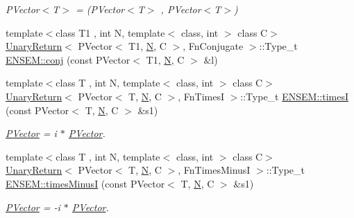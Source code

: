\begin{DoxyCompactItemize}
\begin{DoxyCompactList}\small\item\em P\+Vector$<$\+T$>$ = (P\+Vector$<$\+T$>$ , P\+Vector$<$\+T$>$) \end{DoxyCompactList}\item 
{\footnotesize template$<$class T1 , int N, template$<$ class, int $>$ class C$>$ }\\\mbox{\hyperlink{structUnaryReturn}{Unary\+Return}}$<$ P\+Vector$<$ T1, \mbox{\hyperlink{adat__devel_2lib_2hadron_2operator__name__util_8cc_a7722c8ecbb62d99aee7ce68b1752f337}{N}}, C $>$, Fn\+Conjugate $>$\+::Type\+\_\+t \mbox{\hyperlink{group__primvector_gaf0e85ba33a2d6040ed1d0e3869ae7818}{E\+N\+S\+E\+M\+::conj}} (const P\+Vector$<$ T1, \mbox{\hyperlink{adat__devel_2lib_2hadron_2operator__name__util_8cc_a7722c8ecbb62d99aee7ce68b1752f337}{N}}, C $>$ \&l)
\item 
{\footnotesize template$<$class T , int N, template$<$ class, int $>$ class C$>$ }\\\mbox{\hyperlink{structUnaryReturn}{Unary\+Return}}$<$ P\+Vector$<$ T, \mbox{\hyperlink{adat__devel_2lib_2hadron_2operator__name__util_8cc_a7722c8ecbb62d99aee7ce68b1752f337}{N}}, C $>$, Fn\+TimesI $>$\+::Type\+\_\+t \mbox{\hyperlink{group__primvector_ga0c6f467326b48a0fafa4b42ce712d0c1}{E\+N\+S\+E\+M\+::timesI}} (const P\+Vector$<$ T, \mbox{\hyperlink{adat__devel_2lib_2hadron_2operator__name__util_8cc_a7722c8ecbb62d99aee7ce68b1752f337}{N}}, C $>$ \&s1)
\begin{DoxyCompactList}\small\item\em \mbox{\hyperlink{classENSEM_1_1PVector}{P\+Vector}} = i $\ast$ \mbox{\hyperlink{classENSEM_1_1PVector}{P\+Vector}}. \end{DoxyCompactList}\item 
{\footnotesize template$<$class T , int N, template$<$ class, int $>$ class C$>$ }\\\mbox{\hyperlink{structUnaryReturn}{Unary\+Return}}$<$ P\+Vector$<$ T, \mbox{\hyperlink{adat__devel_2lib_2hadron_2operator__name__util_8cc_a7722c8ecbb62d99aee7ce68b1752f337}{N}}, C $>$, Fn\+Times\+MinusI $>$\+::Type\+\_\+t \mbox{\hyperlink{group__primvector_gaa73c49a7eea92a59f41ed2ae3deeab2f}{E\+N\+S\+E\+M\+::times\+MinusI}} (const P\+Vector$<$ T, \mbox{\hyperlink{adat__devel_2lib_2hadron_2operator__name__util_8cc_a7722c8ecbb62d99aee7ce68b1752f337}{N}}, C $>$ \&s1)
\begin{DoxyCompactList}\small\item\em \mbox{\hyperlink{classENSEM_1_1PVector}{P\+Vector}} = -\/i $\ast$ \mbox{\hyperlink{classENSEM_1_1PVector}{P\+Vector}}. \end{DoxyCompactList}\item 

\end{DoxyCompactItemize}
